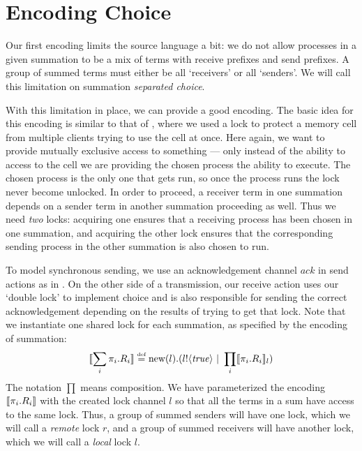 \section{Encoding Choice}\label{failedencoding}
Our first encoding limits the source language a bit: we do not allow processes in a given summation to be a mix of terms with receive prefixes and send prefixes.  
A group of summed terms must either be all `receivers' or all `senders'.  
We will call this limitation on summation \emph{separated choice}.

With this limitation in place, we can provide a good encoding.  
The basic idea for this encoding is similar to that of , where we used a lock to protect a memory cell from multiple clients trying to use the cell at once.  
Here again, we want to provide mutually exclusive access to something --- only instead of the ability to access to the cell we are providing the chosen process the ability to execute.  
The chosen process is the only one that gets run, so once the process runs the lock never become unlocked.  
In order to proceed, a receiver term in one summation depends on a sender term in another summation proceeding as well.
Thus we need \emph{two} locks: acquiring one ensures that a receiving process has been chosen in one summation, and acquiring the other lock ensures that the corresponding sending process in the other summation is also chosen to run.

To model synchronous sending, we use an acknowledgement channel $ack$ in send actions as in .  On the other side of a transmission, our receive action uses our `double lock' to implement choice and is also responsible for sending the correct acknowledgement depending on the results of trying to get that lock.  Note that we instantiate one shared lock for each summation, as specified by the encoding of summation:
\[
	\llbracket{\displaystyle\sum_{i} \pi_i.R_i}\rrbracket \overset{\mbox{\tiny{def}}}{=} \text{new}({l}).({l}!\langle{ \ensuremath{\text{\emph{true}}} }\rangle \ |\  \displaystyle\prod_{i}\llbracket{\pi_i.R_i}\rrbracket_l)
\]
The notation $\prod$ means composition.  We have parameterized the encoding $\llbracket{\pi_i.R_i}\rrbracket$ with the created lock channel $l$ so that all the terms in a sum have access to the same lock.  Thus, a group of summed senders will have one lock, which we will call a \emph{remote} lock $r$, and a group of summed receivers will have another lock, which we will call a \emph{local} lock $l$.

